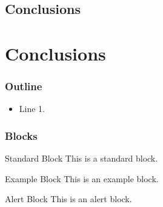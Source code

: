 \documentclass[compress,11 pt,t]{beamer}
\begin{document}
\subsection{Conclusions}

\section{Conclusions}
\addtocounter{framenumber}{-1}
\frame{\vfill\tableofcontents[currentsection,
							  subsubsectionstyle=hide,
							  sectionstyle=show/shaded, 
							  subsectionstyle=show/show/hide]
}




\begin{frame}
\frametitle{Outline}

\begin{itemize}
    \item Line 1.
\end{itemize}


\end{frame}


\begin{frame}
\frametitle{Blocks}

\begin{block}{Standard Block}
    This is a standard block.
\end{block}

\begin{exampleblock}{Example Block}
    This is an example block.
\end{exampleblock}

\begin{alertblock}{Alert Block}
    This is an alert block.
\end{alertblock}



\end{frame}
\end{document}
